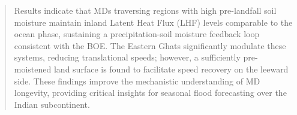 \begin{abstract}
  \noindent Results indicate that MDs traversing regions with high
  pre-landfall soil moisture maintain inland Latent Heat Flux (LHF)
  levels comparable to the ocean phase, sustaining a
  precipitation-soil moisture feedback loop consistent with the BOE.
  The Eastern Ghats significantly modulate these systems, reducing
  translational speeds; however, a sufficiently pre-moistened land
  surface is found to facilitate speed recovery on the leeward side.
  These findings improve the mechanistic understanding of MD
  longevity, providing critical insights for seasonal flood
  forecasting over the Indian subcontinent.

\end{abstract}
